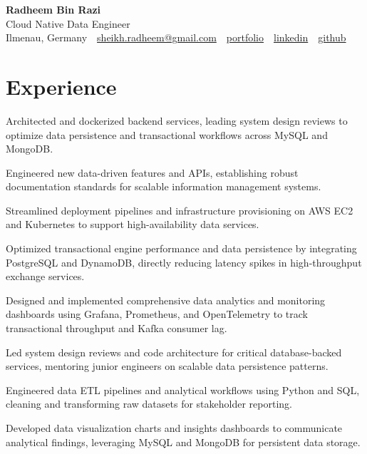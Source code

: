 \documentclass[10pt,a4paper]{resume}
\makeatletter
\newcommand{\Portfolio}{https://radheem.github.io/my-cv}
\newcommand{\PortfolioText}{portfolio}
\newcommand{\GitHub}{https://github.com/radheem}
\newcommand{\LinkedIn}{https://www.linkedin.com/in/radheem-razi}
\newcommand{\Email}{sheikh.radheem@gmail.com}
\makeatother
\begin{document}
\begin{center}
  {\huge\bfseries Radheem Bin Razi}\\[3pt]
  {\large Cloud Native Data Engineer}\\[6pt]
  \small
  Ilmenau, Germany \,\textbar\,
  \href{mailto:\Email}{\Email} \,\textbar\,
  \href{\Portfolio}{\PortfolioText} \,\textbar\,
  \href{\LinkedIn}{linkedin} \,\textbar\,
  \href{\GitHub}{github}
\end{center}
\vspace{2pt}

\section{Experience}

\bullets
  \item Architected and dockerized backend services, leading system design reviews to optimize data persistence and transactional workflows across MySQL and MongoDB.
  \item Engineered new data-driven features and APIs, establishing robust documentation standards for scalable information management systems.
  \item Streamlined deployment pipelines and infrastructure provisioning on AWS EC2 and Kubernetes to support high-availability data services.
\bulletsend
\vspace{1.5pt}
\bullets
  \item Optimized transactional engine performance and data persistence by integrating PostgreSQL and DynamoDB, directly reducing latency spikes in high-throughput exchange services.
  \item Designed and implemented comprehensive data analytics and monitoring dashboards using Grafana, Prometheus, and OpenTelemetry to track transactional throughput and Kafka consumer lag.
  \item Led system design reviews and code architecture for critical database-backed services, mentoring junior engineers on scalable data persistence patterns.
\bulletsend
\vspace{1.5pt}
\bullets
  \item Engineered data ETL pipelines and analytical workflows using Python and SQL, cleaning and transforming raw datasets for stakeholder reporting.
  \item Developed data visualization charts and insights dashboards to communicate analytical findings, leveraging MySQL and MongoDB for persistent data storage.
\bulletsend
\vspace{1.5pt}
\end{document}
